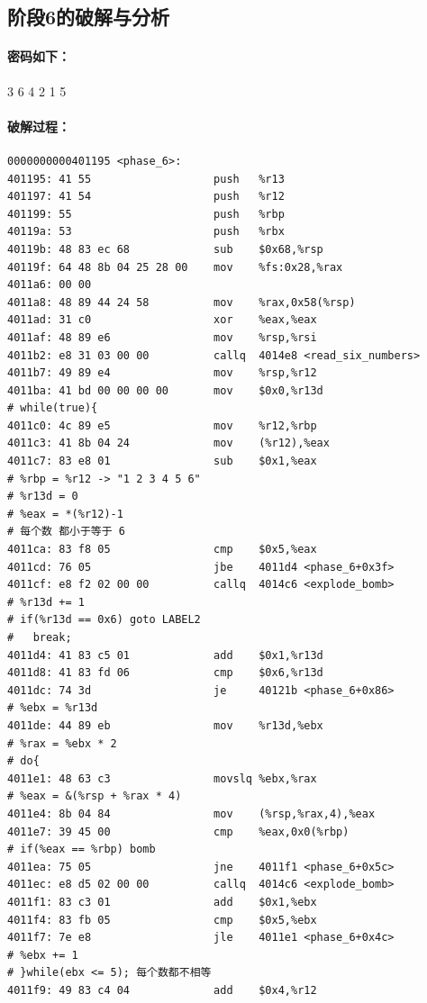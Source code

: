 \subsection{阶段6的破解与分析}

\paragraph{密码如下：}3 6 4 2 1 5

\paragraph{破解过程：}
\begin{lstlisting}
0000000000401195 <phase_6>:
401195:	41 55                	push   %r13
401197:	41 54                	push   %r12
401199:	55                   	push   %rbp
40119a:	53                   	push   %rbx
40119b:	48 83 ec 68          	sub    $0x68,%rsp
40119f:	64 48 8b 04 25 28 00 	mov    %fs:0x28,%rax
4011a6:	00 00 
4011a8:	48 89 44 24 58       	mov    %rax,0x58(%rsp)
4011ad:	31 c0                	xor    %eax,%eax
4011af:	48 89 e6             	mov    %rsp,%rsi
4011b2:	e8 31 03 00 00       	callq  4014e8 <read_six_numbers>
4011b7:	49 89 e4             	mov    %rsp,%r12
4011ba:	41 bd 00 00 00 00    	mov    $0x0,%r13d
# while(true){
4011c0:	4c 89 e5             	mov    %r12,%rbp
4011c3:	41 8b 04 24          	mov    (%r12),%eax
4011c7:	83 e8 01             	sub    $0x1,%eax
# %rbp = %r12 -> "1 2 3 4 5 6"
# %r13d = 0
# %eax = *(%r12)-1
# 每个数 都小于等于 6
4011ca:	83 f8 05             	cmp    $0x5,%eax
4011cd:	76 05                	jbe    4011d4 <phase_6+0x3f>
4011cf:	e8 f2 02 00 00       	callq  4014c6 <explode_bomb>
# %r13d += 1
# if(%r13d == 0x6) goto LABEL2
#   break;
4011d4:	41 83 c5 01          	add    $0x1,%r13d
4011d8:	41 83 fd 06          	cmp    $0x6,%r13d
4011dc:	74 3d                	je     40121b <phase_6+0x86>
# %ebx = %r13d
4011de:	44 89 eb             	mov    %r13d,%ebx
# %rax = %ebx * 2
# do{
4011e1:	48 63 c3             	movslq %ebx,%rax
# %eax = &(%rsp + %rax * 4)
4011e4:	8b 04 84             	mov    (%rsp,%rax,4),%eax
4011e7:	39 45 00             	cmp    %eax,0x0(%rbp)
# if(%eax == %rbp) bomb
4011ea:	75 05                	jne    4011f1 <phase_6+0x5c>
4011ec:	e8 d5 02 00 00       	callq  4014c6 <explode_bomb>
4011f1:	83 c3 01             	add    $0x1,%ebx
4011f4:	83 fb 05             	cmp    $0x5,%ebx
4011f7:	7e e8                	jle    4011e1 <phase_6+0x4c>
# %ebx += 1
# }while(ebx <= 5); 每个数都不相等
4011f9:	49 83 c4 04          	add    $0x4,%r12

\end{lstlisting}

